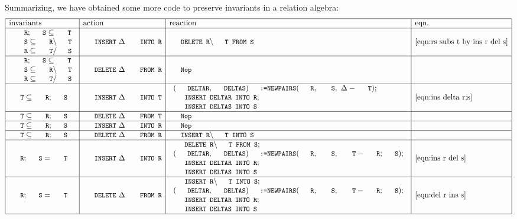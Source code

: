 \documentclass{svproc}
\begin{document}
	Summarizing, we have obtained some more code to preserve invariants in a relation algebra:
\[\begin{array}{|l|l|l|l|}
\hline
\text{invariants}&\text{action}&\text{reaction}&\text{eqn.}\\ \hline
\begin{array}{l}
\code{R};\code{S}\subs\code{T}\\
\code{S}\subs\code{R}\backslash\code{T}\\
\code{R}\subs\code{T}\slash\code{S}
\end{array}&\code{INSERT}\ \Delta\code{ INTO R}&\code{DELETE R}\backslash\code{T FROM S}&\ref{eqn:rs subs t by ins r del s}\\ \hline
\begin{array}{l}
\code{R};\code{S}\subs\code{T}\\
\code{S}\subs\code{R}\backslash\code{T}\\
\code{R}\subs\code{T}\slash\code{S}
\end{array}&\code{DELETE}\ \Delta\code{ FROM R}&\code{Nop}&\\ \hline
\code{T}\subs\code{R};\code{S}&\code{INSERT}\ \Delta\code{ INTO T}&
\begin{array}{l}
(\code{DELTAR},\code{DELTAS})\code{:=NEWPAIRS}(\code{R},\ \code{S},\ \Delta-\code{T});\\
\code{INSERT DELTAR INTO R};\\
\code{INSERT DELTAS INTO S}
\end{array}&\ref{eqn:ins delta r;s}\\ \hline
\code{T}\subs\code{R};\code{S}&\code{DELETE}\ \Delta\code{ FROM T}&\code{Nop}&\\ \hline
\code{T}\subs\code{R};\code{S}&\code{INSERT}\ \Delta\code{ INTO R}&\code{Nop}&\\ \hline
\code{T}\subs\code{R};\code{S}&\code{DELETE}\ \Delta\code{ FROM R}&\code{INSERT R}\backslash\code{T INTO S}&\\ \hline
\code{R};\code{S}=\code{T}&\code{INSERT}\ \Delta\code{ INTO R}&
\begin{array}{l}
\code{DELETE R}\backslash\code{T FROM S};\\
(\code{DELTAR},\code{DELTAS})\code{:=NEWPAIRS}(\code{R},\ \code{S},\ \code{T}-\code{R};\code{S});\\
\code{INSERT DELTAR INTO R};\\
\code{INSERT DELTAS INTO S}
\end{array}&\ref{eqn:ins r del s}\\ \hline
\code{R};\code{S}=\code{T}&\code{DELETE}\ \Delta\code{ FROM R}&
\begin{array}{l}
\code{INSERT R}\backslash\code{T INTO S};\\
(\code{DELTAR},\code{DELTAS})\code{:=NEWPAIRS}(\code{R},\ \code{S},\ \code{T}-\code{R};\code{S});\\
\code{INSERT DELTAR INTO R};\\
\code{INSERT DELTAS INTO S}
\end{array}&\ref{eqn:del r ins s}\\ \hline
\end{array}\]
\end{document}
